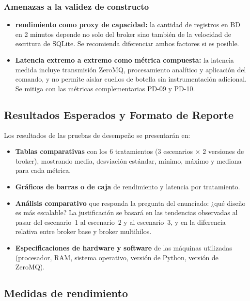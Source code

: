 \documentclass[12pt, a4paper]{article}
\begin{document}
\subsubsection{Amenazas a la validez de constructo}

\begin{itemize}
    \item \textbf{rendimiento como proxy de capacidad:} la cantidad de registros en BD en 2 minutos depende no solo del broker sino también de la velocidad de escritura de SQLite. Se recomienda diferenciar ambos factores si es posible.
    \item \textbf{Latencia extremo a extremo como métrica compuesta:} la latencia medida incluye transmisión ZeroMQ, procesamiento analítico y aplicación del comando, y no permite aislar cuellos de botella sin instrumentación adicional. Se mitiga con las métricas complementarias PD-09 y PD-10.
\end{itemize}

\subsection{Resultados Esperados y Formato de Reporte}

Los resultados de las pruebas de desempeño se presentarán en:

\begin{itemize}
    \item \textbf{Tablas comparativas} con los 6 tratamientos (3 escenarios $\times$ 2 versiones de broker), mostrando media, desviación estándar, mínimo, máximo y mediana para cada métrica.
    \item \textbf{Gráficos de barras o de caja} de rendimiento y latencia por tratamiento.
    \item \textbf{Análisis comparativo} que responda la pregunta del enunciado: ¿qué diseño es más escalable? La justificación se basará en las tendencias observadas al pasar del escenario~1 al escenario~2 y al escenario~3, y en la diferencia relativa entre broker base y broker multihilos.
    \item \textbf{Especificaciones de hardware y software} de las máquinas utilizadas (procesador, RAM, sistema operativo, versión de Python, versión de ZeroMQ).
\end{itemize}

\subsection{Medidas de rendimiento}
\end{document}
